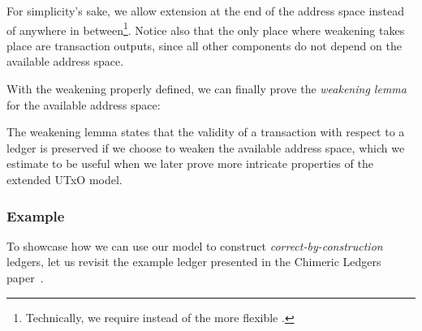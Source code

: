 \documentclass[acmsmall,nonacm=true,screen=true]{acmart}
\begin{document}
\UTXOweaken{}
For simplicity's sake, we allow extension at the end of the address space instead of anywhere in
between\footnote{Technically, we require \inlinePrefix{} instead of the more flexible \inlineSubset{}.}.
Notice also that the only place where weakening takes place are transaction outputs, since all other
components do not depend on the available address space.

With the weakening properly defined, we can finally prove the \textit{weakening lemma} for the available address space:

\UTXOweakenLemma{}
The weakening lemma states that the validity of a transaction with respect to a ledger is preserved if
we choose to weaken the available address space, which we estimate to be useful when we later prove more 
intricate properties of the extended UTxO model.

\subsubsection{Example} \label{subsec:utxo-example}
To showcase how we can use our model to construct \textit{correct-by-construction} ledgers,
let us revisit the example ledger presented in the Chimeric Ledgers paper~\cite{chimeric}.
\end{document}
